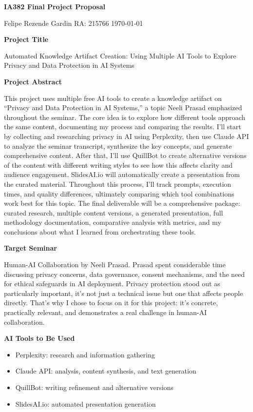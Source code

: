\documentclass[12pt,a4paper]{article}
\begin{document}
\begin{center}
\textbf{\Large IA382 Final Project Proposal}

\vspace{4pt}
{\small Felipe Rezende Gardin RA: 215766 \quad \today}
\end{center}

\vspace{12pt}

\noindent\textbf{Project Title}

Automated Knowledge Artifact Creation: Using Multiple AI Tools to Explore Privacy and Data Protection in AI Systems

\vspace{8pt}

\noindent\textbf{Project Abstract}

This project uses multiple free AI tools to create a knowledge artifact on ``Privacy and Data Protection in AI Systems,'' a topic Neeli Prasad emphasized throughout the seminar. The core idea is to explore how different tools approach the same content, documenting my process and comparing the results. I'll start by collecting and researching privacy in AI using Perplexity, then use Claude API to analyze the seminar transcript, synthesize the key concepts, and generate comprehensive content. After that, I'll use QuillBot to create alternative versions of the content with different writing styles to see how this affects clarity and audience engagement. SlidesAI.io will automatically create a presentation from the curated material. Throughout this process, I'll track prompts, execution times, and quality differences, ultimately comparing which tool combinations work best for this topic. The final deliverable will be a comprehensive package: curated research, multiple content versions, a generated presentation, full methodology documentation, comparative analysis with metrics, and my conclusions about what I learned from orchestrating these tools.

\vspace{8pt}

\noindent\textbf{Target Seminar}

Human-AI Collaboration by Neeli Prasad. Prasad spent considerable time discussing privacy concerns, data governance, consent mechanisms, and the need for ethical safeguards in AI deployment. Privacy protection stood out as particularly important, it's not just a technical issue but one that affects people directly. That's why I chose to focus on it for this project: it's concrete, practically relevant, and demonstrates a real challenge in human-AI collaboration.

\vspace{8pt}

\noindent\textbf{AI Tools to Be Used}

\begin{itemize}
  \item Perplexity: research and information gathering
  \item Claude API: analysis, content synthesis, and text generation
  \item QuillBot: writing refinement and alternative versions
  \item SlidesAI.io: automated presentation generation
\end{itemize}
\end{document}
